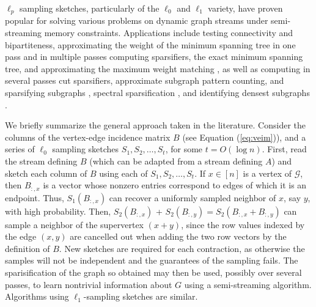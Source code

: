\documentclass[10]{report}
\begin{document}
$\ell_p$ sampling sketches, particularly of the $\ell_0$ and $\ell_1$ variety, have proven popular for solving various problems on dynamic graph streams under semi-streaming memory constraints.
Applications include testing connectivity and bipartiteness, approximating the weight of the minimum spanning tree in one pass and in multiple passes computing sparsifiers, the exact minimum spanning tree, and approximating the maximum weight matching \cite{ahn2012analyzing}, as well as computing in several passes cut sparsifiers, approximate subgraph pattern counting, and sparsifying subgraphs \cite{ahn2012graph}, spectral sparsification \cite{ahn2013spectral}, and identifying densest subgraphs \cite{vu2018data}. 

We briefly summarize the general approach taken in the literature.
Consider the columns of the vertex-edge incidence matrix $B$ (see Equation (\ref{eq:veim})), and a series of $\ell_0$ sampling sketches $S_1, S_2, \dots, S_t$, for some $t = O(\log n)$.
First, read the stream defining $B$ (which can be adapted from a stream defining $A$) and sketch each column of $B$ using each of $S_1, S_2, \dots, S_t$.
If $x \in [n]$ is a vertex of $\mathcal{G}$, then $B_{:,x}$ is a vector whose nonzero entries correspond to edges of which it is an endpoint. 
Thus, $S_1(B_{:,x})$ can recover a uniformly sampled neighbor of $x$, say $y$, with high probability. 
Then, $S_2(B_{:,x})$ + $S_2(B_{:,y}) = S_2(B_{:,x} + B_{:,y})$ can sample a neighbor of the supervertex $(x+y)$, since the row values indexed by the edge $(x,y)$ are cancelled out when adding the two row vectors by the definition of $B$. 
New sketches are required for each contraction, as otherwise the samples will not be independent and the guarantees of the sampling fails. 
The sparisification of the graph so obtained may then be used, possibly over several passes, to learn nontrivial information about $G$ using a semi-streaming algorithm. 
Algorithms using $\ell_1$-sampling sketches are similar. 
\end{document}
